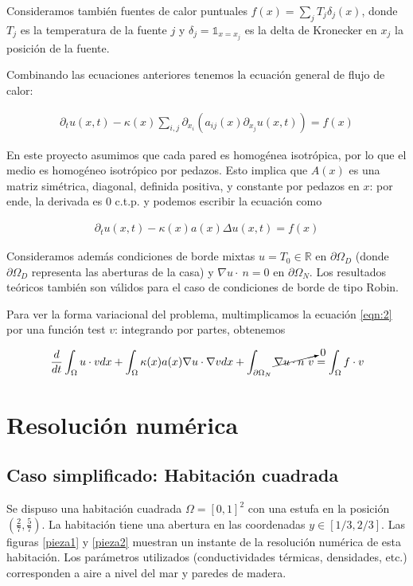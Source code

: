 \documentclass[12pt,paperletter]{article}
\newcommand{\R}{\mathbb{R}}
\renewcommand{\O}{\Omega}
\begin{document}
Consideramos también fuentes de calor puntuales $f(x) = \sum_{j} T_j\delta_j(x)$, donde $T_j$ es la temperatura de la fuente $j$ y $\delta_j = \mathds{1}_{x = x_j}$ es la delta de Kronecker en $x_j$ la posición de la fuente.

Combinando las ecuaciones anteriores tenemos la ecuación general de flujo de calor:

\begin{align}
    \label{eqn:gnral}
     \partial_t u(x,t) - \kappa(x) \sum_{i,j}\partial_{x_i}(a_{ij}(x)\partial_{x_j} u(x,t)) = f(x)
\end{align}

En este proyecto asumimos que cada pared es homogénea isotrópica, por lo que el medio es homogéneo isotrópico por pedazos. Esto implica que $A(x)$ es una matriz simétrica, diagonal, definida positiva, y constante por pedazos en $x$: por ende, la derivada es $0$ c.t.p. y podemos escribir la ecuación como

\begin{align}
    \label{eqn:2}
    \partial_t u(x,t) - \kappa(x)a(x) \Delta u(x,t) = f(x)
\end{align}

Consideramos además condiciones de borde mixtas $u = T_0 \in \R$ en $\partial \O_D$ (donde $\partial \O_D$ representa las aberturas de la casa) y $\nabla u \cdot \ n = 0$ en $\partial \O_N$. Los resultados teóricos también son válidos para el caso de condiciones de borde de tipo Robin.

Para ver la forma variacional del problema, multimplicamos la ecuación \ref{eqn:2} por una función test $v$: integrando por partes, obtenemos

$$\frac{d}{dt}\int_\O u\cdot v dx + \int_\O \kappa(x) a(x) \nabla u\cdot \nabla v dx + \int_{\partial \O_N} \cancelto{0}{\nabla u\cdot n\  v} = \int_\O f\cdot v$$

\newpage
\section{Resolución numérica}
\subsection{Caso simplificado: Habitación cuadrada}

Se dispuso una habitación cuadrada $\O = [0,1]^2$ con una estufa en la posición $(\frac{2}{7}, \frac{5}{7})$. La habitación tiene una abertura en las coordenadas $y \in [1/3,2/3]$. Las figuras \ref{pieza1} y \ref{pieza2} muestran un instante de la resolución numérica de esta habitación. Los parámetros utilizados (conductividades térmicas, densidades, etc.) corresponden a aire a nivel del mar y paredes de madera.
\end{document}
